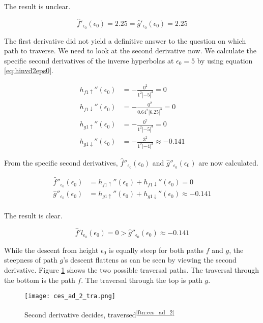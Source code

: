 The result is unclear.

$$\hat{f}'_{\epsilon_0}(\epsilon_0) = 2.25 = \hat{g}'_{\epsilon_0}(\epsilon_0) = 2.25$$

The first derivative did not yield a definitive answer to the question on which path to traverse. We need to look at the second derivative now. We calculate the specific second derivatives of the inverse hyperbolas at $\epsilon_0 = 5$ by using equation \ref{eq:hinvd2eps0}.

\begin{align*}
	h_{f1\uparrow}''(\epsilon_0) &= -\frac{0^2}{1^2 \left| -5 \right|^3} = 0\\
	h_{f1\downarrow}''(\epsilon_0) &= -\frac{0^2}{0.64^2 \left| 6.25 \right|^3} = 0\\
	h_{g1\uparrow}''(\epsilon_0) &= -\frac{0^2}{1^2 \left| -5 \right|^3} = 0\\
	h_{g1\downarrow}''(\epsilon_0) &= -\frac{3^2}{1^2 \left| -4 \right|^3} \approx -0.141 
\end{align*}

From the specific second derivatives, $\hat{f}''_{\epsilon_0}(\epsilon_0)$ and $\hat{g}''_{\epsilon_0}(\epsilon_0)$ are now calculated.

\begin{align*}
	\hat{f}''_{\epsilon_0}(\epsilon_0) &= h_{f1\uparrow}''(\epsilon_0) + h_{f1\downarrow}''(\epsilon_0) = 0\\
	\hat{g}''_{\epsilon_0}(\epsilon_0) &= h_{g1\uparrow}''(\epsilon_0) + h_{g1\downarrow}''(\epsilon_0) \approx -0.141\\
\end{align*}

The result is clear.

$$\hat{f}'l_{\epsilon_0}(\epsilon_0) = 0 > \hat{g}''_{\epsilon_0}(\epsilon_0) \approx -0.141$$

While the descent from height $\epsilon_0$ is equally steep for both paths $f$ and $g$, the steepness of path $g$'s descent flattens as can be seen by viewing the second derivative. Figure \ref{fig:ces_ad_2_tra} shows the two possible traversal paths. The traversal through the bottom is the path $f$. The traversal through the top is path $g$.

\begin{figure}[H]
	\centering
    
    \texttt{[image: ces\_ad\_2\_tra.png]}
		
	\caption{Second derivative decides, traversed\textsuperscript{\ref{ftn:ces_ad_2}}}
    \label{fig:ces_ad_2_tra}
\end{figure}
	

